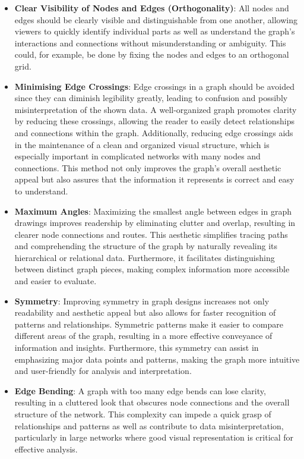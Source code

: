 \documentclass[bachelor, english]{algothesis}
\begin{document}
\begin{itemize}
    \item \textbf{Clear Visibility of Nodes and Edges (Orthogonality)}: All nodes and edges should be clearly visible and distinguishable from one another, allowing viewers to quickly identify individual parts as well as understand the graph's interactions and connections without misunderstanding or ambiguity. This could, for example, be done by fixing the nodes and edges to an orthogonal grid.
    \item \textbf{Minimising Edge Crossings}: Edge crossings in a graph should be avoided since they can diminish legibility greatly, leading to confusion and possibly misinterpretation of the shown data. A well-organized graph promotes clarity by reducing these crossings, allowing the reader to easily detect relationships and connections within the graph. Additionally, reducing edge crossings aids in the maintenance of a clean and organized visual structure, which is especially important in complicated networks with many nodes and connections. This method not only improves the graph's overall aesthetic appeal but also assures that the information it represents is correct and easy to understand.
    \item \textbf{Maximum Angles}: Maximizing the smallest angle between edges in graph drawings improves readership by eliminating clutter and overlap, resulting in clearer node connections and routes. This aesthetic simplifies tracing paths and comprehending the structure of the graph by naturally revealing its hierarchical or relational data. Furthermore, it facilitates distinguishing between distinct graph pieces, making complex information more accessible and easier to evaluate.
    \item \textbf{Symmetry}: Improving symmetry in graph designs increases not only readability and aesthetic appeal but also allows for faster recognition of patterns and relationships. Symmetric patterns make it easier to compare different areas of the graph, resulting in a more effective conveyance of information and insights. Furthermore, this symmetry can assist in emphasizing major data points and patterns, making the graph more intuitive and user-friendly for analysis and interpretation.
    \item \textbf{Edge Bending}: A graph with too many edge bends can lose clarity, resulting in a cluttered look that obscures node connections and the overall structure of the network. This complexity can impede a quick grasp of relationships and patterns as well as contribute to data misinterpretation, particularly in large networks where good visual representation is critical for effective analysis.
\end{itemize}
\end{document}
